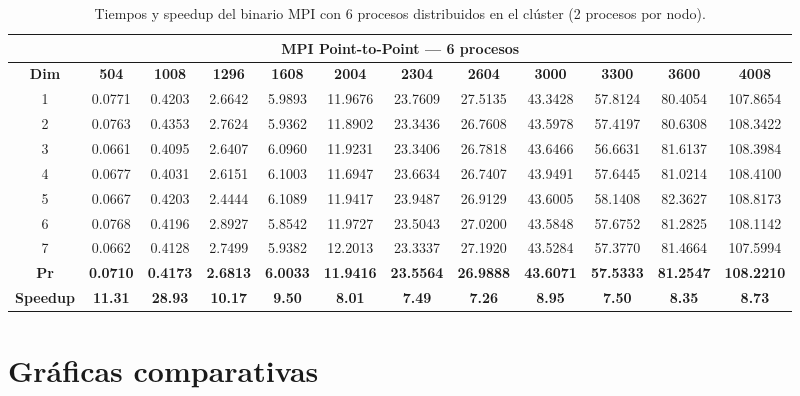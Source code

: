 \documentclass{article}
\begin{document}
\begin{table}[H]
\centering
\tiny
\begin{tabular}{|c|c|c|c|c|c|c|c|c|c|c|c|}
\hline
\multicolumn{12}{|c|}{\textbf{MPI Point-to-Point --- 6 procesos}} \\
\hline
\textbf{Dim} & \textbf{504} & \textbf{1008} & \textbf{1296} & \textbf{1608} & \textbf{2004} & \textbf{2304} & \textbf{2604} & \textbf{3000} & \textbf{3300} & \textbf{3600} & \textbf{4008} \\
\hline
1 & 0.0771 & 0.4203 & 2.6642 & 5.9893 & 11.9676 & 23.7609 & 27.5135 & 43.3428 & 57.8124 & 80.4054 & 107.8654 \\
2 & 0.0763 & 0.4353 & 2.7624 & 5.9362 & 11.8902 & 23.3436 & 26.7608 & 43.5978 & 57.4197 & 80.6308 & 108.3422 \\
3 & 0.0661 & 0.4095 & 2.6407 & 6.0960 & 11.9231 & 23.3406 & 26.7818 & 43.6466 & 56.6631 & 81.6137 & 108.3984 \\
4 & 0.0677 & 0.4031 & 2.6151 & 6.1003 & 11.6947 & 23.6634 & 26.7407 & 43.9491 & 57.6445 & 81.0214 & 108.4100 \\
5 & 0.0667 & 0.4203 & 2.4444 & 6.1089 & 11.9417 & 23.9487 & 26.9129 & 43.6005 & 58.1408 & 82.3627 & 108.8173 \\
6 & 0.0768 & 0.4196 & 2.8927 & 5.8542 & 11.9727 & 23.5043 & 27.0200 & 43.5848 & 57.6752 & 81.2825 & 108.1142 \\
7 & 0.0662 & 0.4128 & 2.7499 & 5.9382 & 12.2013 & 23.3337 & 27.1920 & 43.5284 & 57.3770 & 81.4664 & 107.5994 \\
\hline
\textbf{Pr} & \textbf{0.0710} & \textbf{0.4173} & \textbf{2.6813} & \textbf{6.0033} & \textbf{11.9416} & \textbf{23.5564} & \textbf{26.9888} & \textbf{43.6071} & \textbf{57.5333} & \textbf{81.2547} & \textbf{108.2210} \\
\hline
\textbf{Speedup} & \textbf{11.31} & \textbf{28.93} & \textbf{10.17} & \textbf{9.50} & \textbf{8.01} & \textbf{7.49} & \textbf{7.26} & \textbf{8.95} & \textbf{7.50} & \textbf{8.35} & \textbf{8.73} \\
\hline
\end{tabular}
\caption{Tiempos y speedup del binario MPI con 6 procesos distribuidos en el clúster (2 procesos por nodo).}
\label{tab:p2p6}
\end{table}

\section{Gráficas comparativas}
\end{document}
